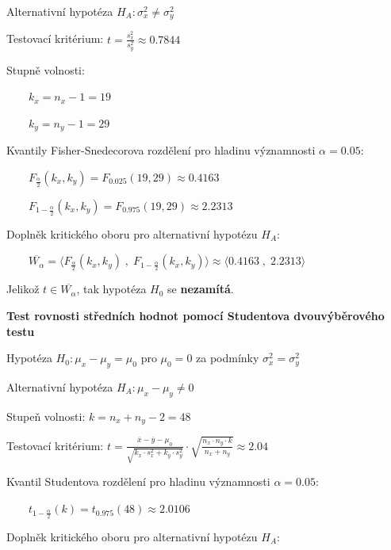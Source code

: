 \documentclass[11pt, a4paper, titlepage]{article}
\begin{document}
Alternativní hypotéza ${\displaystyle H_A : \sigma_x^2 \neq \sigma_y^2}$
\medskip

Testovací kritérium: ${\displaystyle t = \frac{s_x^2}{s_y^2} \approx 0.7844}$
\medskip

Stupně volnosti:
\medskip

${\displaystyle \qquad k_x = n_x - 1 = 19}$
\medskip

${\displaystyle \qquad k_y = n_y - 1 = 29}$
\medskip

Kvantily Fisher-Snedecorova rozdělení pro hladinu významnosti ${\displaystyle \alpha = 0.05}$:
\medskip

${\displaystyle \qquad F_{\frac{\alpha}{2}} (k_x, k_y) = F_{0.025} (19, 29) \approx 0.4163}$
\medskip

${\displaystyle \qquad F_{1 - \frac{\alpha}{2}} (k_x, k_y) = F_{0.975} (19, 29) \approx 2.2313}$
\medskip

Doplněk kritického oboru pro alternativní hypotézu ${\displaystyle H_A}$:
\medskip

${\displaystyle \qquad \overline{W_\alpha} = \big\langle F_{\frac{\alpha}{2}} (k_x, k_y) \;,\; F_{1 - \frac{\alpha}{2}} (k_x, k_y) \big\rangle \approx \big\langle 0.4163 \;,\; 2.2313 \big\rangle}$
\medskip

Jelikož ${\displaystyle t \in \overline{W_\alpha}}$, tak hypotéza ${\displaystyle H_0}$ se \textbf{nezamítá}.
\bigskip
\bigskip



\textbf{Test rovnosti středních hodnot pomocí Studentova dvouvýběrového testu}
\medskip

Hypotéza ${\displaystyle H_0 : \mu_x - \mu_y = \mu_0}$ pro ${\displaystyle \mu_0 = 0}$ za podmínky ${\displaystyle \sigma_x^2 = \sigma_y^2}$
\medskip

Alternativní hypotéza ${\displaystyle H_A : \mu_x - \mu_y \neq 0}$
\medskip

Stupeň volnosti: ${\displaystyle k = n_x + n_y -2 = 48}$
\medskip

Testovací kritérium: ${\displaystyle t = \frac{\overline{x} - \overline{y} - \mu_0}{\sqrt{k_x \cdot s_x^2 + k_y \cdot s_y^2}} \cdot \sqrt{\frac{n_x \cdot n_y \cdot k}{n_x + n_y}} \approx 2.04}$
\medskip

Kvantil Studentova rozdělení pro hladinu významnosti ${\displaystyle \alpha = 0.05}$:
\medskip

${\displaystyle \qquad t_{1 - \frac{\alpha}{2}}(k) = t_{0.975}(48) \approx 2.0106}$
\medskip

Doplněk kritického oboru pro alternativní hypotézu ${\displaystyle H_{A}}$:
\medskip
\end{document}
